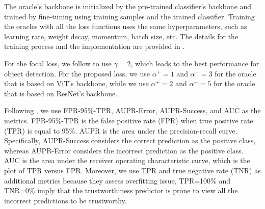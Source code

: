 The oracle's backbone is initialized by the pre-trained classifier's backbone and trained by fine-tuning using training samples and the trained classifier.
Training the oracles with all the loss functions uses the same hyperparameters, such as learning rate, weight decay, momentum, batch size, etc.
The details for the training process and the implementation are provided in .

For the focal loss, we follow \cite{Lin_ICCV_2017} to use $\gamma=2$,  which leads to the best performance for object detection.
For the proposed loss, we use $\alpha^{+}=1$ and $\alpha^{-}=3$ for the oracle that is based on ViT's backbone, while we use $\alpha^{+}=2$ and $\alpha^{-}=5$ for the oracle that is based on ResNet's backbone.

Following \cite{Corbiere_NIPS_2019}, we use FPR-95\%-TPR, AUPR-Error, AUPR-Success, and AUC as the metrics.
FPR-95\%-TPR is the false positive rate (FPR) when true positive rate (TPR) is equal to 95\%. 
AUPR is the area under the precision-recall curve. 
Specifically, AUPR-Success considers the correct prediction as the positive class, whereas AUPR-Error considers the incorrect prediction as the positive class.
AUC is the area under the receiver operating characteristic curve, which is the plot of TPR versus FPR.
Moreover, we use TPR and true negative rate (TNR) as additional metrics because they assess overfitting issue, \eg TPR=100\% and TNR=0\% imply that the trustworthiness predictor is prone to view all the incorrect predictions to be trustworthy. %


